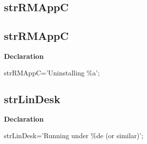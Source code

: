 \documentclass{report}
\newif\ifpdf
\begin{document}
\subsection*{\large{\textbf{strRMAppC}}\normalsize\hspace{1ex}\hrulefill}
\else
\subsection*{strRMAppC}
\fi
\label{trstrings-strRMAppC}
\begin{list}{}{
\setlength{\itemindent}{0cm}
\setlength{\listparindent}{0cm}
\setlength{\leftmargin}{\evensidemargin}
\addtolength{\leftmargin}{\tmplength}
\settowidth{\labelsep}{X}
\addtolength{\leftmargin}{\labelsep}
\setlength{\labelwidth}{\tmplength}
}
\item[\textbf{Declaration}\hfill]
\ifpdf
\begin{flushleft}
\fi
\begin{ttfamily}
strRMAppC='Uninstalling {\%}a';\end{ttfamily}

\ifpdf
\end{flushleft}
\fi

\end{list}
\ifpdf
\subsection*{\large{\textbf{strLinDesk}}\normalsize\hspace{1ex}\hrulefill}
\else
\subsection*{strLinDesk}
\fi
\label{trstrings-strLinDesk}
\begin{list}{}{
\setlength{\itemindent}{0cm}
\setlength{\listparindent}{0cm}
\setlength{\leftmargin}{\evensidemargin}
\addtolength{\leftmargin}{\tmplength}
\settowidth{\labelsep}{X}
\addtolength{\leftmargin}{\labelsep}
\setlength{\labelwidth}{\tmplength}
}
\item[\textbf{Declaration}\hfill]
\ifpdf
\begin{flushleft}
\fi
\begin{ttfamily}
strLinDesk='Running under {\%}de (or similar)';\end{ttfamily}

\ifpdf
\end{flushleft}
\fi

\end{list}
\ifpdf
\end{document}
